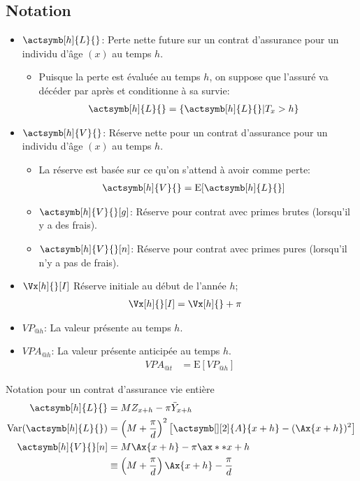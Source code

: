 \documentclass[10pt, french]{article}
\begin{document}
\begin{multicols*}{2}
\subsection*{Notation}
\begin{itemize}[leftmargin = *]
	\item[] 	$\actsymb[h]{L}{}$: Perte nette future sur un contrat d'assurance pour un individu d'âge $(x)$ au temps $h$.
		\begin{itemize}[leftmargin = *]
		\item	Puisque la perte est évaluée au temps $h$, on suppose que l'assuré va décéder par après et conditionne à sa survie:
			\begin{align*}
			\actsymb[h]{L}{}	
			&=	\{ \actsymb[h]{L}{} | T_{x} > h \}
			\end{align*}
		\end{itemize}
	\item[]	$\actsymb[h]{V}{}$: Réserve nette pour un contrat d'assurance pour un individu d'âge $(x)$ au temps $h$.
		\begin{itemize}[leftmargin = *]
		\item	La réserve est basée sur ce qu'on s'attend à avoir comme perte:
			\begin{align*}
			\actsymb[h]{V}{}	
			&=	\text{E}[\actsymb[h]{L}{}]	
			\end{align*}
		\item[]	$\actsymb[h]{V}{}[g]$: Réserve pour contrat avec primes brutes (lorsqu'il y a des frais).
		\item[]	$\actsymb[h]{V}{}[n]$: Réserve pour contrat avec primes pures (lorsqu'il n'y a pas de frais).
		\end{itemize}
	\item[]	$\Vx[h]{}[I]$	Réserve initiale au début de l'année $h$;
		\begin{align*}
		\Vx[h]{}[I]	&=	\Vx[h]{} + \pi
		\end{align*}
	\item[]	$VP_{@h}$: La valeur présente au temps $h$.
	\item[]	$VPA_{@h}$: La valeur présente anticipée au temps $h$.
		\begin{align*}
		VPA_{@t}	
		&=	\text{E}[VP_{@h}]
		\end{align*}
\end{itemize}

\begin{examplebox}{Notation pour un contrat d'assurance vie entière}
\begin{align*}
	\actsymb[h]{L}{}	
	&=	M Z_{x + h} - \pi \ddot{Y}_{x + h}	\\
	\text{Var}(\actsymb[h]{L}{})
	&=	\left(M + \frac{\pi}{d}\right)^{2} \left[ \actsymb[][2]{A}{x + h} - (\Ax{x + h})^{2} \right]	\\
	\actsymb[h]{V}{}[n]	
	&=	M \Ax{x + h} - \pi \ax**{x + h}	\\
	&\equiv	\left(M + \frac{\pi}{d}\right) \Ax{x + h} - \frac{\pi}{d}
\end{align*}


\end{examplebox}
\end{multicols*}
\end{document}
